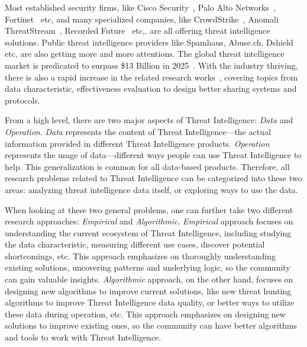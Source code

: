 Most established security firms, like Cisco Security~\cite{ciscotalos}, 
Palo Alto Networks~\cite{panautofocus}, Fortinet~\cite{fortinet} etc, 
and many specialized companies, like CrowdStrike~\cite{crowdstrike}, 
Anomali ThreatStream~\cite{anomali}, Recorded Future~\cite{recordedfuture}
etc,. are all offering threat intelligence solutions. Public threat
intelligence providers like Spamhaus, Abuse.ch, Dshield etc, are also 
getting more and more attentions. The global threat intelligence market is
predicated to surpass \$13 Billion in 2025~\cite{tipredict2018}. With the
industry thriving, there is also a rapid increase in the related research
works~\cite{tounsi2018survey}, covering topics from data characteristic,
effectiveness evaluation to design better sharing systems and protocols.

From a high level, there are two major aspects of Threat Intelligence: 
\textit{Data} and \textit{Operation}. \textit{Data} represents the content 
of Threat Intelligence---the actual information provided in different Threat
Intelligence products. \textit{Operation} represents the usage of 
data---different ways people can use Threat Intelligence to help. This
generalization is common for all data-based products. Therefore,
all research problems related to Threat Intelligence can be categorized into
these two areas: analyzing threat intelligence data itself, or exploring
ways to use the data.

When looking at these two general problems, one can further 
take two different research approaches: \textit{Empirical} and 
\textit{Algorithmic}. \textit{Empirical} approach focuses on understanding
the current ecosystem of Threat Intelligence, including studying the 
data characteristic, measuring different use cases, discover potential 
shortcomings, etc. This approach emphasizes on thoroughly understanding
existing solutions, uncovering patterns and underlying logic, 
so the community can gain valuable insights.
\textit{Algorithmic} approach, on the other hand, 
focuses on designing new algorithms to 
improve current solutions, like new threat hunting algorithms to improve 
Threat Intelligence data quality, or better ways to utilize these data 
during operation, etc. This approach emphasizes on designing new solutions 
to improve existing ones, so the community can have better algorithms and
tools to work with Threat Intelligence.

